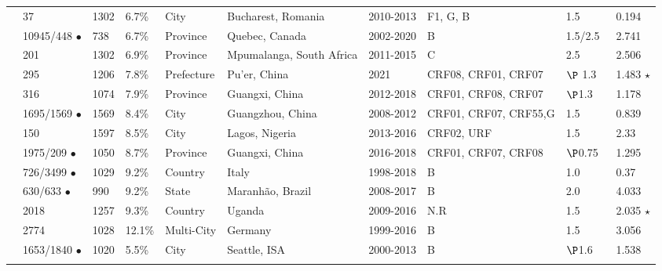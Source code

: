 \documentclass[utf8]{FrontiersinHarvard} %
\begin{document}
\begin{table}[h]
\begin{ssmall}
\begin{tabular}{llllllllll}
		\cite{Temereanca:2017aa} & 37 & 1302 & 6.7\% & City & Bucharest, Romania & 2010-2013 & F1, G, B & 1.5 & 0.194 \\
		\cite{brenner_role_2021}  & 10945/448 $\bullet$ & 738 & 6.7\% & Province & Quebec, Canada       & 2002-2020  & B     & 1.5/2.5\    & 2.741   \\
		\citet{sivay_hiv-1_2018} & 201 & 1302 & 6.9\% & Province & Mpumalanga, South Africa & 2011-2015  & C     & 2.5          &2.506   \\
		\cite{Li:2022aa} & 295 & 1206 & 7.8\%& Prefecture & Pu'er, China & 2021 & CRF08, CRF01, CRF07 & $\P$ 1.3 & 1.483  $\star$ \\
		\cite{Yu:2022aa} & 316 & 1074 & 7.9\% & Province & Guangxi, China & 2012-2018 & CRF01, CRF08, CRF07  & $\P$1.3 & 1.178 \\
		\cite{Yan:2021aa}& 1695/1569 $\bullet$ & 1569 & 8.4\% & City & Guangzhou, China        & 2008-2012      & CRF01, CRF07, CRF55,G & 1.5          & 0.839   \\
		\cite{Billings:2019aa} & 150 & 1597 & 8.5\% & City & Lagos, Nigeria & 2013-2016 & CRF02, URF & 1.5 & 2.33 \\ 
		\cite{Chen:2023aa} & 1975/209  $\bullet$ & 1050 & 8.7\% & Province & Guangxi, China & 2016-2018 & CRF01, CRF07, CRF08   & $\P$0.75 & 1.295  \\
		\cite{Fabeni:2020aa} & 726/3499 $\bullet$  & 1029 & 9.2\% & Country & Italy & 1998-2018 & B & 1.0 & 0.37 \\
		\cite{Leal:2020aa} & 630/633 $\bullet$ & 990 & 9.2\% & State & Maranhão, Brazil & 2008-2017 & B & 2.0 & 4.033 \\
		\cite{bbosa_short_2020} &2018 &  1257 & 9.3\% & Country  & Uganda       & 2009-2016     & N.R   & 1.5          & 2.035 $\star$  \\
		\cite{Stecher:2018aa} & 2774 & 1028 & 12.1\% & Multi-City & Germany & 1999-2016 & B & 1.5 & 3.056\\
		\cite{chato_public_2020} & 1653/1840 $\bullet$  & 1020 &  5.5\% & City &Seattle, ISA & 2000-2013 &  B & $\P$1.6 & 1.538 \\
			\\
		
		
		\hline
	\end{tabular}
	\end{ssmall}
\end{table}
\end{document}
